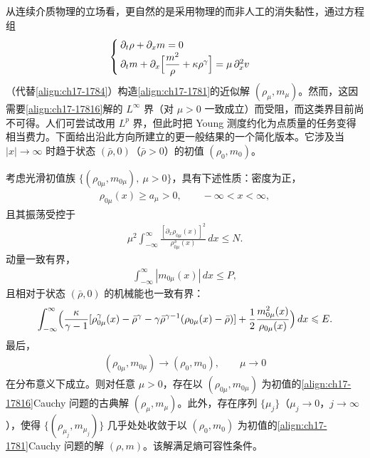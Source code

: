 \documentclass[../../main.tex]{subfiles}
\begin{document}
从连续介质物理的立场看，更自然的是采用物理的而非人工的消失黏性，通过方程组
\begin{align}
\begin{cases}
\partial_t\rho+\partial_x m=0\\
\partial_t m+\partial_x\Bigl[\dfrac{m^2}{\rho}+\kappa\rho^\gamma\Bigr]=\mu\,\partial_x^2v
\end{cases}
\label{align:ch17-17816}
\end{align}
（代替\eqref{align:ch17-1784}）构造\eqref{align:ch17-1781}的近似解 $(\rho_\mu,m_\mu)$。然而，这因需要\eqref{align:ch17-17816}解的 $L^\infty$ 界（对 $\mu>0$ 一致成立）而受阻，而这类界目前尚不可得。人们可尝试改用 $L^p$ 界，但此时把 Young 测度约化为点质量的任务变得相当费力。下面给出沿此方向所建立的更一般结果的一个简化版本。它涉及当 $|x|\to\infty$ 时趋于状态 $(\bar\rho,0)$（$\bar\rho>0$）的初值 $(\rho_0,m_0)$。

\begin{theorem}[等熵气体的物理黏性极限]\label{theorem:ch17-气体物理黏性}
考虑光滑初值族 $\{(\rho_{0\mu},m_{0\mu}),\ \mu>0\}$，具有下述性质：密度为正，
\begin{align}
\rho_{0\mu}(x)\geqslant a_\mu>0,\qquad-\infty<x<\infty,
\label{align:ch17-17817}
\end{align}
且其振荡受控于
\begin{align}
\mu^2\int_{-\infty}^\infty\frac{[\partial_x\rho_{0\mu}(x)]^2}{\rho_{0\mu}^3(x)}\,dx\leqslant N.
\label{align:ch17-17818}
\end{align}
动量一致有界，
\begin{align}
\int_{-\infty}^\infty|m_{0\mu}(x)|\,dx\leqslant P,
\label{align:ch17-17819}
\end{align}
且相对于状态 $(\bar\rho,0)$ 的机械能也一致有界：
\begin{align}
\int_{-\infty}^\infty\Bigl(\frac{\kappa}{\gamma-1}[\rho_{0\mu}^\gamma(x)-\bar\rho^\gamma-\gamma\bar\rho^{\gamma-1}(\rho_{0\mu}(x)-\bar\rho)]+\frac{1}{2}\frac{m_{0\mu}^2(x)}{\rho_{0\mu}(x)}\Bigr)\,dx\leqslant E.
\label{align:ch17-17820}
\end{align}
最后，
\begin{align}
(\rho_{0\mu},m_{0\mu})\longrightarrow(\rho_0,m_0),\qquad\mu\to0
\label{align:ch17-17821}
\end{align}
在分布意义下成立。则对任意 $\mu>0$，存在以 $(\rho_{0\mu},m_{0\mu})$ 为初值的\eqref{align:ch17-17816}Cauchy 问题的古典解 $(\rho_\mu,m_\mu)$。此外，存在序列 $\{\mu_j\}$（$\mu_j\to0$，$j\to\infty$），使得 $\{(\rho_{\mu_j},m_{\mu_j})\}$ 几乎处处收敛于以 $(\rho_0,m_0)$ 为初值的\eqref{align:ch17-1781}Cauchy 问题的解 $(\rho,m)$。该解满足熵可容性条件。
\end{theorem}
\end{document}
